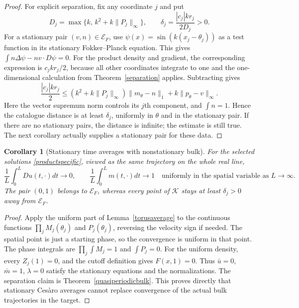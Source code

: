 \documentclass[11pt]{article}
\newtheorem{corollary}[theorem]{Corollary}
\begin{document}
\begin{proof}
For explicit separation, fix any coordinate $j$ and put
\[
 D_j=\max\{k,\,k^2+k\|P_j\|_\infty\},\qquad
 \delta_j=\frac{|c_j|kr_j}{2D_j}>0.
\]
For a stationary pair $(v,n)\in\mathcal E_F$, use
$\psi(x)=\sin(k(x_j-\theta_j))$ as a test function in its stationary
Fokker--Planck equation. This gives
$\int n\Delta\psi-nv\cdot D\psi=0$.
For the product density and gradient, the corresponding expression is
$c_jkr_j/2$, because all other coordinates integrate to one and the
one-dimensional calculation from Theorem~\ref{separation} applies.
Subtracting gives
\[
 \frac{|c_j|kr_j}{2}
 \leq(k^2+k\|P_j\|_\infty)\|m_\theta-n\|_1
                     +k\|p_\theta-v\|_\infty.
\]
Here the vector supremum norm controls its $j$th component, and
$\int n=1$. Hence the catalogue distance is at least $\delta_j$,
uniformly in $\theta$ and in the stationary pair. If there are no
stationary pairs, the distance is infinite; the estimate is still true.
The next corollary actually supplies a stationary pair for these data.
\end{proof}

\begin{corollary}[Stationary time averages with nonstationary bulk]
\label{averageversusbulk}
For the selected solutions \eqref{productspecific}, viewed as the same
trajectory on the whole real line,
\[
 \frac1L\int_0^L Du(t,\cdot)dt\longrightarrow0,\qquad
 \frac1L\int_0^L m(t,\cdot)dt\longrightarrow1
 \quad\text{uniformly in the spatial variable as }L\to\infty.
\]
The pair $(0,1)$ belongs to $\mathcal E_F$, whereas every point of
$\mathcal K$ stays at least $\delta_j>0$ away from $\mathcal E_F$.
\end{corollary}
\begin{proof}
Apply the uniform part of Lemma~\ref{torusaverage} to the continuous
functions $\prod_jM_j(\theta_j)$ and $P_j(\theta_j)$, reversing the
velocity sign if needed. The spatial point is just a starting phase,
so the convergence is uniform in that point. The phase integrals are
$\prod_j\int M_j=1$ and $\int P_j=0$.
For the uniform density, every $Z_j(1)=0$, and the cutoff definition
gives $F(x,1)=0$. Thus $\bar u=0$, $\bar m=1$, $\lambda=0$
satisfy the stationary equations and the normalizations. The separation
claim is Theorem~\ref{quasiperiodicbulk}. This proves directly that
stationary Ces\`aro averages cannot replace convergence of the actual
bulk trajectories in the target.
\end{proof}
\end{document}
